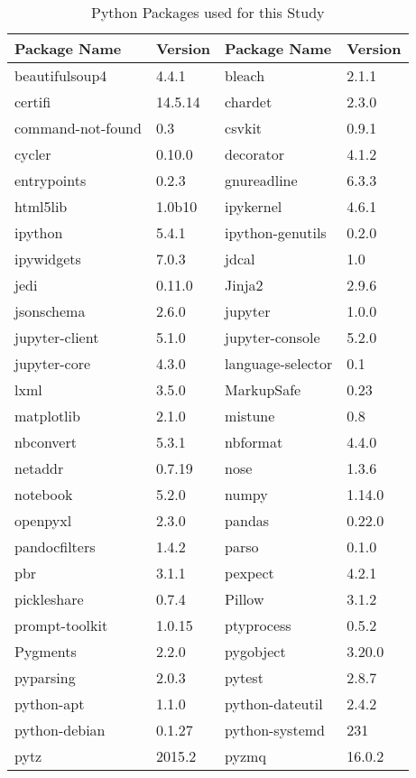 \begin{table}[!h]
	\centering
	\caption{Python Packages used for this Study}
	\label{table:packages}
	\begin{tabular}{||l|l|l|l||}
  		\toprule
  		\textbf{Package Name} & \textbf{Version} & \textbf{Package Name} & \textbf{Version}\\ 
  		\midrule
  		beautifulsoup4 & 4.4.1 & bleach & 2.1.1 \\
		certifi & 14.5.14 & chardet & 2.3.0 \\
		command-not-found & 0.3 & csvkit & 0.9.1 \\
		cycler & 0.10.0 & decorator & 4.1.2 \\
		entrypoints & 0.2.3 & gnureadline & 6.3.3 \\
		html5lib & 1.0b10 & ipykernel & 4.6.1 \\
		ipython & 5.4.1 & ipython-genutils & 0.2.0 \\
		ipywidgets & 7.0.3 & jdcal & 1.0 \\
		jedi & 0.11.0 & Jinja2 & 2.9.6 \\
		jsonschema & 2.6.0 & jupyter & 1.0.0 \\
		jupyter-client & 5.1.0 & jupyter-console & 5.2.0 \\
		jupyter-core & 4.3.0 & language-selector & 0.1 \\
		lxml & 3.5.0 & MarkupSafe & 0.23 \\
		matplotlib & 2.1.0 & mistune & 0.8 \\
		nbconvert & 5.3.1 & nbformat & 4.4.0 \\
		netaddr & 0.7.19 & nose & 1.3.6 \\
		notebook & 5.2.0 & numpy & 1.14.0 \\
		openpyxl & 2.3.0 & pandas & 0.22.0 \\
		pandocfilters & 1.4.2 & parso & 0.1.0 \\
		pbr & 3.1.1 & pexpect & 4.2.1 \\
		pickleshare & 0.7.4 & Pillow & 3.1.2 \\
		prompt-toolkit & 1.0.15 & ptyprocess & 0.5.2 \\
		Pygments & 2.2.0 & pygobject & 3.20.0 \\
		pyparsing & 2.0.3 & pytest & 2.8.7 \\
		python-apt & 1.1.0 & python-dateutil & 2.4.2 \\
		python-debian & 0.1.27 & python-systemd & 231 \\
		pytz & 2015.2 & pyzmq & 16.0.2 \\

\end{tabular}
\end{table}
